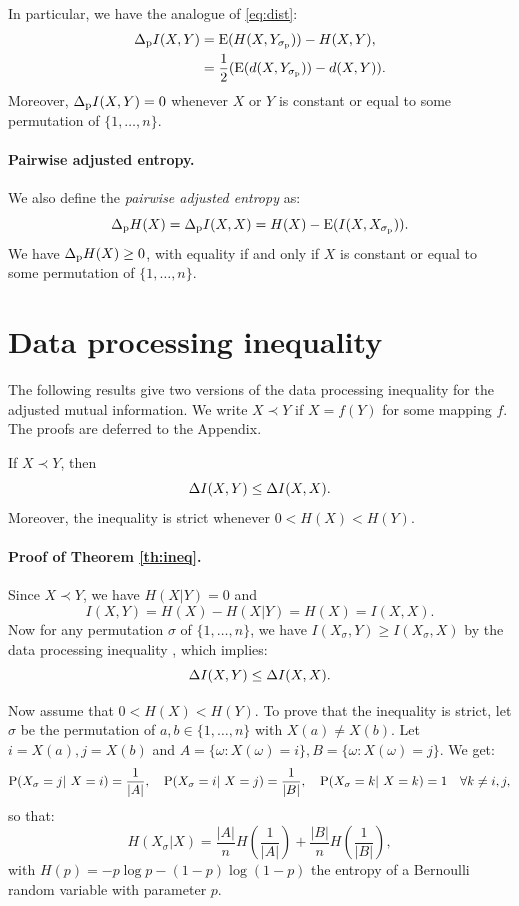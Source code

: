 In particular, we  have the analogue of \eqref{eq:dist}:
\begin{align}
\Delta_{\rm p}I(X,Y)& ={\rm E}(H(X, Y_{\sigma_{\rm p}})) - H(X,Y),\nonumber\\
&= \frac 1 2 ({\rm E}(d(X, Y_{\sigma_{\rm p}})) - d(X,Y)). \label{eq:ip2} 
\end{align}
Moreover, $\Delta_{\rm p}I(X,Y)=0$ whenever $X$ or $Y$ is 
constant or equal to some permutation of $\{1,\ldots,n\}$.

\paragraph{Pairwise adjusted entropy.}
We  also define the {\it pairwise adjusted entropy} as:
$$
\Delta_{\rm p} H(X) = \Delta_{\rm p}I(X,X) =  H(X) - {\rm E}(I(X, X_{\sigma_{\rm p}})).
$$
We have $\Delta_{\rm p} H(X) \ge 0$, with equality if and only if  $X$ is constant or equal to some permutation of $\{1,\ldots,n\}$.


\section{Data processing inequality}
The following results give two versions of the data processing inequality for the adjusted mutual information.  We write $X\prec Y$ if $X = f(Y)$ for some mapping $f$. The proofs are deferred to the Appendix.

\begin{theorem}\label{th:ineq}
	If $X\prec Y$, then 
	$$ 
	\Delta I(X, Y) \le \Delta I(X,X).$$
	Moreover, the inequality is strict whenever $0 < H(X) < H(Y)$.
\end{theorem}

\paragraph{Proof of Theorem \ref{th:ineq}.}
Since $X \prec Y$,  
we have  $H(X|Y) = 0$ and
$$
I(X,Y) = H(X) - H(X|Y) = H(X) = I(X,X).
$$
Now for any permutation $\sigma$ of $\{1,\ldots,n\}$, we have $I(X_\sigma, Y) \ge I(X_\sigma, X)$ by the data processing inequality \cite{cover}, 
which implies:
$$
\Delta I(X, Y) \le  \Delta I (X, X).
$$

Now assume that $0 < H(X) < H(Y)$.
To prove that the inequality is strict, let $\sigma$ be the permutation of  $a, b \in\{1,\ldots,n\}$ with $X(a) \ne X(b)$.  Let $i  = X(a), j= X(b)$ and $A = \{\omega: X(\omega) = i\}, B=\{\omega: X(\omega) = j\}$. 
We get:
$$
\P(X_\sigma=j | X=i) =  \frac 1 {|A|},\quad  \P(X_\sigma=i | X=j) =  \frac 1 {|B|}, \quad 
\P(X_\sigma=k | X=k) =  1\quad \forall k\ne i, j,
$$
so that:
$$
H(X_\sigma |X)= \frac{|A|}n  H\left( \frac 1 {|A|}\right) + \frac{|B|}n  H\left( \frac 1 {|B|}\right),
$$
with $H(p) = -p\log p - (1-p)\log(1-p)$ the entropy of a Bernoulli random variable with parameter $p$.

